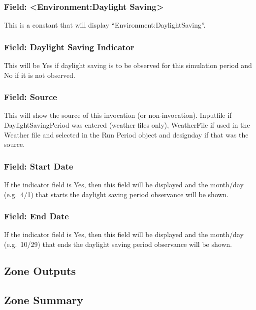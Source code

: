 \subsubsection{Field: \textless{}Environment:Daylight Saving\textgreater{}}\label{field-environmentdaylight-saving}

This is a constant that will display ``Environment:DaylightSaving''.

\subsubsection{Field: Daylight Saving Indicator}\label{field-daylight-saving-indicator}

This will be Yes if daylight saving is to be observed for this simulation period and No if it is not observed.

\subsubsection{Field: Source}\label{field-source-1}

This will show the source of this invocation (or non-invocation). Inputfile if DaylightSavingPeriod was entered (weather files only), WeatherFile if used in the Weather file and selected in the Run Period object and designday if that was the source.

\subsubsection{Field: Start Date}\label{field-start-date-2}

If the indicator field is Yes, then this field will be displayed and the month/day (e.g.~4/1) that starts the daylight saving period observance will be shown.

\subsubsection{Field: End Date}\label{field-end-date-1}

If the indicator field is Yes, then this field will be displayed and the month/day (e.g.~10/29) that ends the daylight saving period observance will be shown.

\subsection{Zone Outputs}\label{zone-outputs}

\subsection{Zone Summary}\label{zone-summary}

